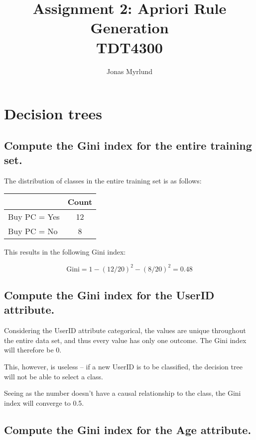 \documentclass[11pt,a4paper]{article}
\begin{document}
\title{Assignment 2: Apriori Rule Generation \\ \large{TDT4300}}
\author{Jonas Myrlund}

\maketitle

\section{Decision trees}

\subsection{Compute the Gini index for the entire training set.}

The distribution of classes in the entire training set is as follows:

\begin{tabular}{|l|c|}
                          \hline
               & Count \\ \hline
  Buy PC = Yes & 12    \\ \hline
  Buy PC = No  & 8     \\ \hline
\end{tabular}

This results in the following Gini index:

\begin{equation}
  \text{Gini} = 1 - (12/20)^2 - (8/20)^2 = 0.48
\end{equation}

\subsection{Compute the Gini index for the UserID attribute.}

Considering the UserID attribute categorical, the values are unique throughout the entire data set, and thus every value has only one outcome. The Gini index will therefore be 0.

This, however, is useless -- if a new UserID is to be classified, the decision tree will not be able to select a class.

Seeing as the number doesn't have a causal relationship to the class, the Gini index will converge to 0.5.

\subsection{Compute the Gini index for the Age attribute.}
\end{document}
